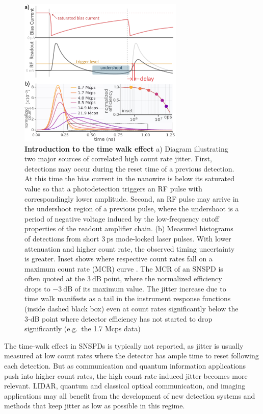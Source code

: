 \documentclass[11pt]{caltech_thesis} %
\begin{document}
\hypertarget{fig:jitterate_intro}{%
\begin{figure}
\centering
\includegraphics[width=0.7\textwidth,height=\textheight]{chapter_02/figs_02/intro_jitterate_light.pdf}
\caption[{Introduction to the time walk effect}]{\textbf{Introduction to
the time walk effect} a) Diagram illustrating two major sources of
correlated high count rate jitter. First, detections may occur during
the reset time of a previous detection. At this time the bias current in
the nanowire is below its saturated value so that a photodetection
triggers an RF pulse with correspondingly lower amplitude. Second, an RF
pulse may arrive in the undershoot region of a previous pulse, where the
undershoot is a period of negative voltage induced by the low-frequency
cutoff properties of the readout amplifier chain. (b) Measured
histograms of detections from short $3~\mathrm{ps}$ mode-locked laser
pulses. With lower attenuation and higher count rate, the observed
timing uncertainty is greater. Inset shows where respective count rates
fall on a maximum count rate (MCR) curve \autocite{Zhang_MCR_2019}. The
MCR of an SNSPD is often quoted at the $3~\mathrm{dB}$ point, where the
normalized efficiency drops to $-3~\mathrm{dB}$ of its maximum value.
The jitter increase due to time walk manifests as a tail in the
instrument response functions (inside dashed black box) even at count
rates significantly below the 3-dB point where detector efficiency has
not started to drop significantly (e.g.~the 1.7 Mcps data)}
\label{fig:jitterate_intro}
\end{figure}
}

The time-walk effect in SNSPDs is typically not reported, as jitter is
usually measured at low count rates where the detector has ample time to
reset following each detection. But as communication and quantum
information applications push into higher count rates, the high count
rate induced jitter becomes more relevant. LIDAR, quantum and classical
optical communication, and imaging applications may all benefit from the
development of new detection systems and methods that keep jitter as low
as possible in this regime.
\end{document}
